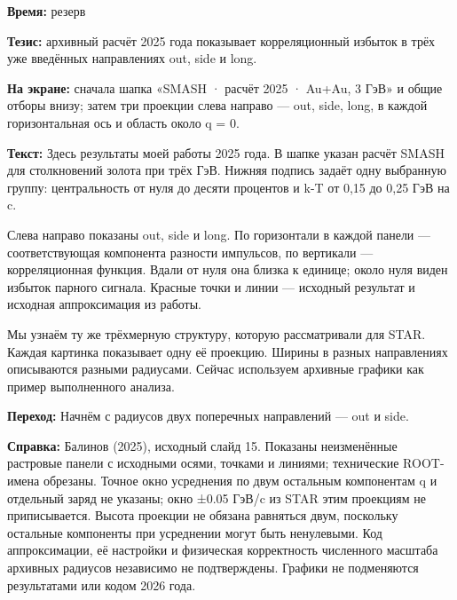 \textbf{Время:} резерв

\textbf{Тезис:} архивный расчёт 2025 года показывает корреляционный избыток в трёх уже введённых направлениях out, side и long.

\textbf{На экране:} сначала шапка «SMASH · расчёт 2025 · Au+Au, 3 ГэВ» и общие отборы внизу; затем три проекции слева направо — out, side, long, в каждой горизонтальная ось и область около q = 0.

\textbf{Текст:} Здесь результаты моей работы 2025 года. В шапке указан расчёт SMASH для столкновений золота при трёх ГэВ. Нижняя подпись задаёт одну выбранную группу: центральность от нуля до десяти процентов и k-T от 0,15 до 0,25 ГэВ на c.

Слева направо показаны out, side и long. По горизонтали в каждой панели — соответствующая компонента разности импульсов, по вертикали — корреляционная функция. Вдали от нуля она близка к единице; около нуля виден избыток парного сигнала. Красные точки и линии — исходный результат и исходная аппроксимация из работы.

Мы узнаём ту же трёхмерную структуру, которую рассматривали для STAR. Каждая картинка показывает одну её проекцию. Ширины в разных направлениях описываются разными радиусами. Сейчас используем архивные графики как пример выполненного анализа.

\textbf{Переход:} Начнём с радиусов двух поперечных направлений — out и side.

\textbf{Справка:} Балинов (2025), исходный слайд 15. Показаны неизменённые растровые панели с исходными осями, точками и линиями; технические ROOT-имена обрезаны. Точное окно усреднения по двум остальным компонентам q и отдельный заряд не указаны; окно ±0.05 ГэВ/c из STAR этим проекциям не приписывается. Высота проекции не обязана равняться двум, поскольку остальные компоненты при усреднении могут быть ненулевыми. Код аппроксимации, её настройки и физическая корректность численного масштаба архивных радиусов независимо не подтверждены. Графики не подменяются результатами или кодом 2026 года.

